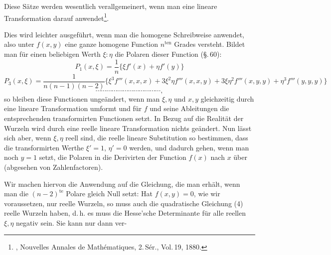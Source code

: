 %
Diese Sätze werden wesentlich verallgemeinert, wenn man eine lineare
Transformation darauf anwendet\footnote{, Nouvelles
Annales de Math\'ematiques, 2.\,S\'er., Vol.\,19, 1880.}.

Dies wird leichter ausgeführt, wenn man die homogene Schreibweise anwendet,
also unter $f(x,y)$ eine ganze homogene Function $n^{\mathrm{ten}}$ Grades
versteht. Bildet man für einen beliebigen Werth $\xi:\eta$ die Polaren
dieser Function (\S.\,60):
\[
P_1(x,\xi) = \frac{1}{n}\{\xi f'(x) + \eta f'(y)\}
\]
\[
P_3(x,\xi) = \frac{1}{n(n-1)(n-2)}\{\xi^3 f'''(x,x,x) + 3\xi^2\eta f'''(x,x,y) + 3\xi\eta^2 f'''(x,y,y) + \eta^3 f'''(y,y,y)\}
\]
\[
\cdots\cdots\cdots\cdots\cdots\cdots\cdots\cdots\cdots\cdots\cdots\cdots,
\]
so bleiben diese Functionen ungeändert, wenn man $\xi, \eta$ und $x, y$
gleichzeitig durch eine lineare Transformation umformt und für $f$ und
seine Ableitungen die entsprechenden transformirten Functionen setzt. In
Bezug auf die Realität der Wurzeln wird durch eine reelle lineare
Transformation nichts geändert. Nun lässt sich aber, wenn $\xi, \eta$ reell
sind, die reelle lineare Substitution so bestimmen, dass die transformirten
Werthe $\xi' = 1$, $\eta' = 0$ werden, und dadurch gehen, wenn man noch
$y = 1$ setzt, die Polaren in die Derivirten der Function $f(x)$ nach $x$
über (abgesehen von Zahlenfactoren).


Wir machen hiervon die Anwendung auf die Gleichung, die man erhält, wenn
man die $(n-2)^{\mathrm{te}}$ Polare gleich Null setzt:
Hat $f(x,y) = 0$, wie wir voraussetzen, nur reelle Wurzeln, so muss auch die
quadratische Gleichung (4) reelle Wurzeln haben, d.\,h. es muss die
Hesse'sche Determinante
für alle reellen $\xi, \eta$ negativ sein. Sie kann nur dann ver-
